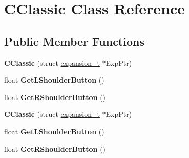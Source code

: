 \hypertarget{class_c_classic}{\section{C\-Classic Class Reference}
\label{class_c_classic}
}
\subsection*{Public Member Functions}
\begin{DoxyCompactItemize}
\item 
\hypertarget{class_c_classic_ac682fe2a19e88a0dd1fff9a12586d6e2}{{\bfseries C\-Classic} (struct \hyperlink{structexpansion__t}{expansion\-\_\-t} $\ast$Exp\-Ptr)}\label{class_c_classic_ac682fe2a19e88a0dd1fff9a12586d6e2}

\item 
\hypertarget{class_c_classic_a7ea18d3535fb4534790a6b24e33e8c56}{float {\bfseries Get\-L\-Shoulder\-Button} ()}\label{class_c_classic_a7ea18d3535fb4534790a6b24e33e8c56}

\item 
\hypertarget{class_c_classic_a58ac294e9273589037f60a1d2e4fcfac}{float {\bfseries Get\-R\-Shoulder\-Button} ()}\label{class_c_classic_a58ac294e9273589037f60a1d2e4fcfac}

\item 
\hypertarget{class_c_classic_ac682fe2a19e88a0dd1fff9a12586d6e2}{{\bfseries C\-Classic} (struct \hyperlink{structexpansion__t}{expansion\-\_\-t} $\ast$Exp\-Ptr)}\label{class_c_classic_ac682fe2a19e88a0dd1fff9a12586d6e2}

\item 
\hypertarget{class_c_classic_a7ea18d3535fb4534790a6b24e33e8c56}{float {\bfseries Get\-L\-Shoulder\-Button} ()}\label{class_c_classic_a7ea18d3535fb4534790a6b24e33e8c56}

\item 
\hypertarget{class_c_classic_a58ac294e9273589037f60a1d2e4fcfac}{float {\bfseries Get\-R\-Shoulder\-Button} ()}\label{class_c_classic_a58ac294e9273589037f60a1d2e4fcfac}

\end{DoxyCompactItemize}
